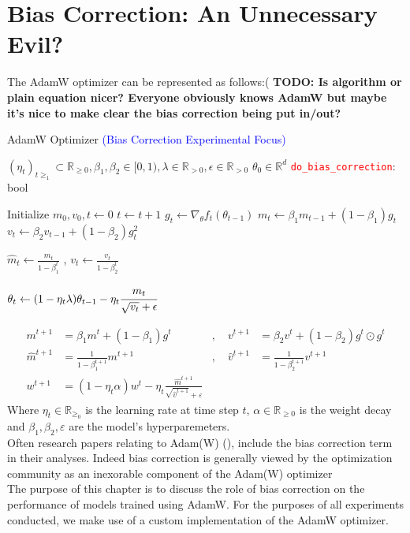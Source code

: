 \documentclass[12pt]{book}
\newcommand{\R}{\mathbb{R}}
\newcommand{\todo}[1]{{\color{red}\bf{TODO: #1}}}
\begin{document}
\section{Bias Correction: An Unnecessary Evil? }
The AdamW optimizer can be represented as follows:( \todo{Is algorithm or plain equation nicer? Everyone obviously knows AdamW but maybe it's nice to make clear the bias correction being put in/out?}
\begin{algorithm}
\caption{AdamW Optimizer \textcolor{blue}{(Bias Correction Experimental Focus)}}
\label{alg:adam}
\begin{algorithmic}[1]
\Require $(\eta_t)_{t\ge_1} \subset \R_{\ge0}, \beta_1, \beta_2\in [0, 1),  \lambda \in\R_{>0}, \epsilon \in \R_{>0}$ 
\Require $\theta_0\in\R^{d}$ 
\Require \textcolor{red}{\texttt{do\_bias\_correction}}: bool \Comment{\textcolor{red}{Experimental flag}}

\State Initialize $m_0, v_0, t \gets 0$
    \State $t \gets t + 1$
    \State $g_t \gets \nabla_\theta f_t(\theta_{t-1})$
    \State $m_t \gets \beta_1 m_{t-1} + (1-\beta_1)g_t$
    \State $v_t \gets \beta_2 v_{t-1} + (1-\beta_2)g_t^2$
    
    \State $\hat{m}_t \gets \frac{m_t}{1-\beta_1^t}$ , $v_t \gets \frac{v_t}{1-\beta_2^t}$ \Comment{\textcolor{blue}{bias correction not by default}}
    \EndIf
    
    \State $\theta_t \gets (1 - \eta_t \lambda) \theta_{t-1} - \eta_t \cfrac{m_t}{\sqrt{v_t} + \epsilon}$
\EndWhile
\end{algorithmic}
\end{algorithm}
\begin{equation*}
\begin{aligned}
	m^{t+1} &= \beta_1 m^{t} + (1-\beta_1)g^{t}  &, \quad  v^{t+1} &= \beta_2 v^{t} + (1-\beta_2) g^{t} \odot g^{t}\\
	\hat{m}^{t+1} &= \frac{1}{1-\beta_1^{t+1}} m^{t+1}  &, \quad \hat{v}^{t+1} &= \frac{1}{1-\beta_2^{t+1}} v^{t+1}\\
	w^{t+1} &= (1-\eta_t\alpha)w^{t} - \eta_t \frac{\hat{m}^{t+1}}{\sqrt{\hat{v}^{t+1}} +\varepsilon }
\end{aligned}
\end{equation*}
Where $\eta_t\in\R_{\ge_0}$ is the learning rate at time step $t$, $\alpha\in \R_{\ge0}$ is the weight decay and $\beta_1, \beta_2, \varepsilon $ are the model's hyperparemeters. 
\\
Often research papers relating to Adam(W) (\cite{Goodfellow-et-al-2016}), include the bias correction term in their analyses. 
Indeed bias correction is generally viewed by the optimization community as an inexorable component of the Adam(W) optimizer\\
The purpose of this chapter is to discuss the role of bias correction on the performance of models trained using AdamW. For the purposes of all experiments conducted, we make use of a custom implementation of the AdamW optimizer. 
\end{document}
